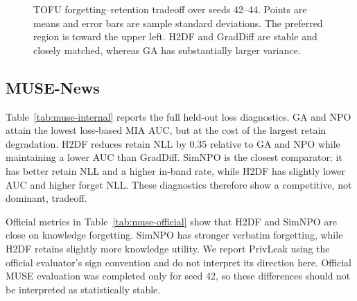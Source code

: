 \documentclass[10pt,twocolumn]{article}
\newcommand{\method}{\textsc{H2DF}}
\begin{document}
\begin{figure}[t]
\centering
{}
\caption{TOFU forgetting--retention tradeoff over seeds 42--44. Points are
means and error bars are sample standard deviations. The preferred region is
toward the upper left. \method{} and GradDiff are stable and closely matched,
whereas GA has substantially larger variance.}
\label{fig:tofu-tradeoff}
\end{figure}
\subsection{MUSE-News}

Table~\ref{tab:muse-internal} reports the full held-out loss diagnostics. GA and
NPO attain the lowest loss-based MIA AUC, but at the cost of the largest retain
degradation. \method{} reduces retain NLL by 0.35 relative to GA and NPO while
maintaining a lower AUC than GradDiff. SimNPO is the closest comparator: it has
better retain NLL and a higher in-band rate, while \method{} has slightly lower
AUC and higher forget NLL. These diagnostics therefore show a competitive, not
dominant, tradeoff.

Official metrics in Table~\ref{tab:muse-official} show that \method{} and SimNPO
are close on knowledge forgetting. SimNPO has stronger verbatim forgetting,
while \method{} retains slightly more knowledge utility. We report PrivLeak
using the official evaluator's sign convention and do not interpret its
direction here. Official MUSE evaluation was completed only for seed 42, so
these differences should not be interpreted as statistically stable.
\end{document}
